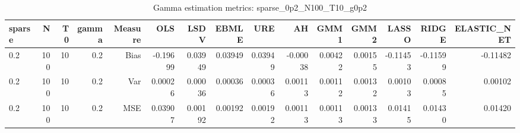 \begin{table}[!htbp]\centering
\caption{Gamma estimation metrics: sparse_0p2_N100_T10_g0p2}
\label{tab:table1_sparse_0p2_N100_T10_g0p2}
\begin{tabular}{lrrrrrrrrrrrrrr}
\hline
sparse & N & T0 & gamma & Measure & OLS & LSDV & EBMLE & URE & AH & GMM1 & GMM2 & LASSO & RIDGE & ELASTIC_NET \\
\hline
0.2 & 100 & 10 & 0.2 & Bias & -0.19699 & 0.03949 & 0.03949 & 0.03949 & -0.00038 & 0.00422 & 0.00155 & -0.11453 & -0.11599 & -0.11482 \\
0.2 & 100 & 10 & 0.2 & Var & 0.00026 & 0.00036 & 0.00036 & 0.00036 & 0.00113 & 0.00112 & 0.00132 & 0.00103 & 0.00085 & 0.00102 \\
0.2 & 100 & 10 & 0.2 & MSE & 0.03907 & 0.00192 & 0.00192 & 0.00192 & 0.00113 & 0.00113 & 0.00133 & 0.01415 & 0.01430 & 0.01420 \\
\hline
\end{tabular}
\end{table}


